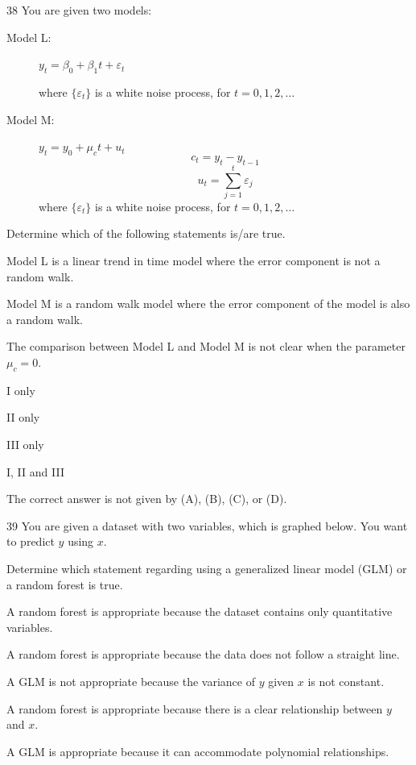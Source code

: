 \begin{question}{38}
You are given two models:
\begin{description}
\item[Model L:] $y_t = \beta_0 + \beta_1 t + \varepsilon_t$

where $\{\varepsilon_t\}$ is a white noise process, for $t = 0,1,2,\ldots$

\item[Model M:] $y_t = y_0 + \mu_c t + u_t$
\[ c_t = y_t - y_{t-1} \]
\[ u_t = \sum_{j=1}^{t} \varepsilon_j \]
where $\{\varepsilon_t\}$ is a white noise process, for $t = 0,1,2,\ldots$
\end{description}

Determine which of the following statements is/are true.
\begin{statements}
\item Model L is a linear trend in time model where the error component is not a random walk.
\item Model M is a random walk model where the error component of the model is also a random walk.
\item The comparison between Model L and Model M is not clear when the parameter $\mu_c = 0$.
\end{statements}

\begin{choices}
\item I only
\item II only
\item III only
\item I, II and III
\item The correct answer is not given by (A), (B), (C), or (D).
\end{choices}
\end{question}

\begin{question}{39}
You are given a dataset with two variables, which is graphed below. You want to predict $y$ using $x$.


Determine which statement regarding using a generalized linear model (GLM) or a random forest is true.

\begin{choices}
\item A random forest is appropriate because the dataset contains only quantitative variables.
\item A random forest is appropriate because the data does not follow a straight line.
\item A GLM is not appropriate because the variance of $y$ given $x$ is not constant.
\item A random forest is appropriate because there is a clear relationship between $y$ and $x$.
\item A GLM is appropriate because it can accommodate polynomial relationships.
\end{choices}
\end{question}

